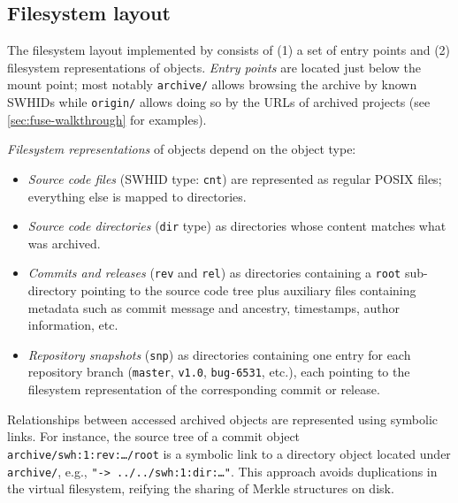 \subsection{Filesystem layout}

The filesystem layout implemented by \SWHFSpy{} consists of (1) a set of entry
points and (2) filesystem representations of \SWH{} objects. \emph{Entry points}
are located just below the \SWHFS{} mount point; most notably \texttt{archive/}
allows browsing the \SWH{} archive by known SWHIDs while \texttt{origin/} allows
doing so by the URLs of archived projects (see \cref{sec:fuse-walkthrough}
for examples).

\emph{Filesystem representations} of \SWH{} objects depend on the object type:
\begin{itemize}

\item \emph{Source code files} (SWHID type: \texttt{cnt}) are represented as
  regular POSIX files; everything else is mapped to directories.

\item \emph{Source code directories} (\texttt{dir} type) as directories whose
  content matches what was archived.

\item \emph{Commits and releases} (\texttt{rev} and \texttt{rel}) as
  directories containing a \texttt{root} sub-directory pointing to the source
  code tree plus auxiliary files containing metadata such as commit message and
  ancestry, timestamps, author information, etc.

\item \emph{Repository snapshots} (\texttt{snp}) as directories containing one
  entry for each repository branch (\texttt{master}, \texttt{v1.0},
  \texttt{bug-6531}, etc.), each pointing to the filesystem representation of
  the corresponding commit or release.

\end{itemize}

Relationships between accessed archived objects are represented using symbolic
links. For instance, the source tree of a commit object
\texttt{archive/swh:1:rev:…/root} is a symbolic link to a directory object
located under \texttt{archive/}, e.g., \texttt{"->~../../swh:1:dir:…"}. This
approach avoids duplications in the virtual filesystem, reifying the sharing of
Merkle structures on disk.

